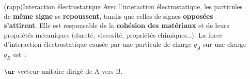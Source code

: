 \documentclass[../../main/main.tex]{subfiles}
\begin{document}
\begin{tcb}(rapp){Interaction électrostatique}
	Avec l'interaction électrostatique, les particules de \textbf{même signe} se
	\textbf{repoussent}, tandis que celles de signes \textbf{opposées s'attirent}.
	Elle est responsable de la \textbf{cohésion des matériaux} et de leurs
	propriétés mécaniques (dureté, viscosité, propriétés chimiques…).
	\smallbreak
	La force d'interaction électrostatique causée par une particule de charge $q_A$
	sur une charge $q_B$ est~:
	\smallbreak
	\begin{isd}
		\psw{%
			\[
				\Ff_{e,\rm A\ra B} = \frac{1}{4\pi\ep_0} \frac{q_Aq_B}{\rm AB^2}\ur
				\qavec
				\ur = \frac{\vv{\rm AB}}{\rm AB}
			\]
		}%
		$\ur$ vecteur unitaire dirigé de A vers B.
		\tcblower
		\begin{center}
			\vspace{-15pt}
		\end{center}
	\end{isd}
\end{tcb}
\end{document}
